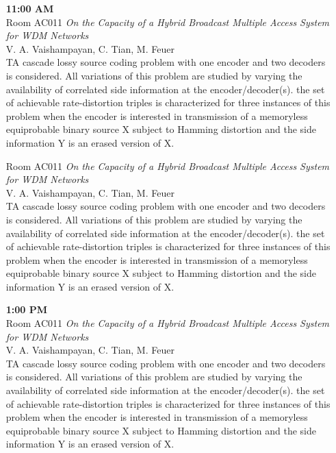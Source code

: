 \documentclass[a4,twoside,11pt]{report}
\begin{document}
\begin{enumerate}[leftmargin=3cm, labelsep=0.3cm, rightmargin=0cm, align=right, itemsep=0ex, style=multiline]
\item[{\hfill \bf 11:00 AM} \\ {\hfill Room AC011}]
{\it On the Capacity of a Hybrid Broadcast Multiple Access System for WDM Networks} \\
{V. A. Vaishampayan, C. Tian, M. Feuer} \\
{\small TA cascade lossy source coding problem with one encoder and
two decoders is considered. All variations of this problem are
studied by varying the availability of correlated side information
at the encoder/decoder(s).  the set of achievable rate-distortion
triples is characterized for three instances of this problem when
the encoder is interested in transmission of a memoryless equiprobable
binary source X subject to Hamming distortion and the side information
Y is an erased version of X.  }

\item[{\hfill Room AC011}]
{\it On the Capacity of a Hybrid Broadcast Multiple Access System for WDM Networks} \\
{V. A. Vaishampayan, C. Tian, M. Feuer} \\
{\small TA cascade lossy source coding problem with one encoder and
two decoders is considered. All variations of this problem are
studied by varying the availability of correlated side information
at the encoder/decoder(s).  the set of achievable rate-distortion
triples is characterized for three instances of this problem when
the encoder is interested in transmission of a memoryless equiprobable
binary source X subject to Hamming distortion and the side information
Y is an erased version of X.  }

\item[{\hfill \bf 1:00 PM} \\ {\hfill Room AC011}]
{\it On the Capacity of a Hybrid Broadcast Multiple Access System for WDM Networks} \\
{V. A. Vaishampayan, C. Tian, M. Feuer} \\
{\small TA cascade lossy source coding problem with one encoder and
two decoders is considered. All variations of this problem are
studied by varying the availability of correlated side information
at the encoder/decoder(s).  the set of achievable rate-distortion
triples is characterized for three instances of this problem when
the encoder is interested in transmission of a memoryless equiprobable
binary source X subject to Hamming distortion and the side information
Y is an erased version of X.  }


\end{enumerate}
\end{document}
